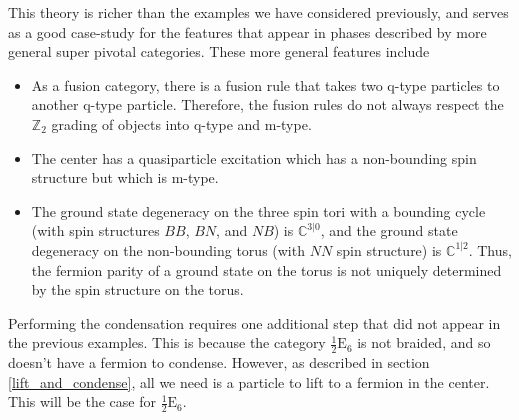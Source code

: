 \documentclass[12pt,a4paper]{article}
\newcommand{\zt}{\mathbb{Z}_2}
\newcommand{\kw}[1]{{\color{kwcolor}\footnotesize{(KW) #1}}}
\newcommand{\dave}[1]{{\color{ao(english)}\footnotesize{(DA) #1}}}
\newcommand{\ethan}[1]{{\color{amethyst}\footnotesize{(EL) #1}}}
\newcommand{\halfesix}{\frac{1}{2}\text{E}_6}
\begin{document}

This theory is richer than the examples we have considered previously, and serves as a good 
case-study for the features that appear in phases described by more general super pivotal 
categories. 
These more general features include 
\begin{itemize}
\item As a fusion category, there is a fusion rule that takes two q-type particles to another q-type particle. 
Therefore, the fusion rules do not always respect the $\zt$ grading of objects into q-type and m-type. 
\item The center has a quasiparticle excitation which has a non-bounding spin structure but which is m-type.
\item The ground state degeneracy on the three spin tori with a bounding cycle (with spin structures $BB$, $BN$, and $NB$) is $\mathbb{C}^{3|0}$, and the ground state degeneracy on the non-bounding torus (with $NN$ spin structure) is $\mathbb{C}^{1|2}$.
Thus, the fermion parity of a ground state on the torus is not uniquely determined by the spin structure on the torus.
\end{itemize}

Performing the condensation requires one additional step that did not appear in the previous examples. 
This is because the category $\halfesix$ is not braided, and so doesn't have a fermion to condense.
However, as described in section \ref{lift_and_condense}, all we need is a particle to lift to a fermion in the center. 
This will be the case for $\halfesix$.
\end{document}
